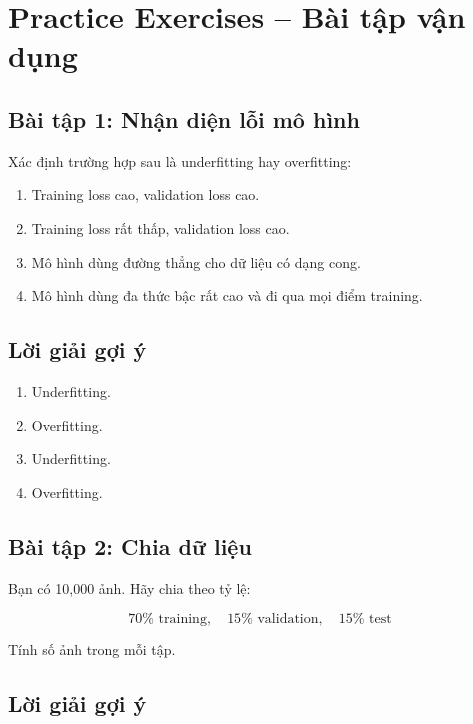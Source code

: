 \section{Practice Exercises -- Bài tập vận dụng}

\subsection*{Bài tập 1: Nhận diện lỗi mô hình}

Xác định trường hợp sau là underfitting hay overfitting:

\begin{enumerate}
    \item Training loss cao, validation loss cao.
    \item Training loss rất thấp, validation loss cao.
    \item Mô hình dùng đường thẳng cho dữ liệu có dạng cong.
    \item Mô hình dùng đa thức bậc rất cao và đi qua mọi điểm training.
\end{enumerate}

\subsection*{Lời giải gợi ý}

\begin{enumerate}
    \item Underfitting.
    \item Overfitting.
    \item Underfitting.
    \item Overfitting.
\end{enumerate}

\subsection*{Bài tập 2: Chia dữ liệu}

Bạn có 10,000 ảnh. Hãy chia theo tỷ lệ:

\[
    70\% \text{ training}, \quad 15\% \text{ validation}, \quad 15\% \text{ test}
\]

Tính số ảnh trong mỗi tập.

\subsection*{Lời giải gợi ý}

